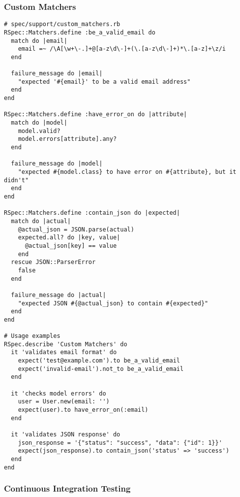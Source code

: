 \documentclass[12pt,a4paper]{article}
\begin{document}
\subsubsection{Custom Matchers}

\begin{lstlisting}
# spec/support/custom_matchers.rb
RSpec::Matchers.define :be_a_valid_email do
  match do |email|
    email =~ /\A[\w+\-.]+@[a-z\d\-]+(\.[a-z\d\-]+)*\.[a-z]+\z/i
  end

  failure_message do |email|
    "expected '#{email}' to be a valid email address"
  end
end

RSpec::Matchers.define :have_error_on do |attribute|
  match do |model|
    model.valid?
    model.errors[attribute].any?
  end

  failure_message do |model|
    "expected #{model.class} to have error on #{attribute}, but it didn't"
  end
end

RSpec::Matchers.define :contain_json do |expected|
  match do |actual|
    @actual_json = JSON.parse(actual)
    expected.all? do |key, value|
      @actual_json[key] == value
    end
  rescue JSON::ParserError
    false
  end

  failure_message do |actual|
    "expected JSON #{@actual_json} to contain #{expected}"
  end
end

# Usage examples
RSpec.describe 'Custom Matchers' do
  it 'validates email format' do
    expect('test@example.com').to be_a_valid_email
    expect('invalid-email').not_to be_a_valid_email
  end

  it 'checks model errors' do
    user = User.new(email: '')
    expect(user).to have_error_on(:email)
  end

  it 'validates JSON response' do
    json_response = '{"status": "success", "data": {"id": 1}}'
    expect(json_response).to contain_json('status' => 'success')
  end
end
\end{lstlisting}

\subsubsection{Continuous Integration Testing}
\end{document}
